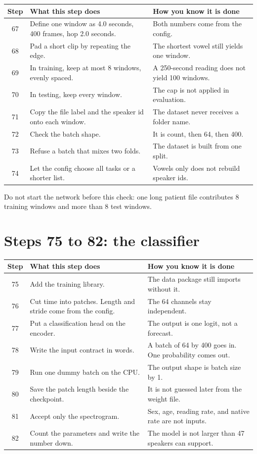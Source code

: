 \documentclass[11pt]{article}
\begin{document}
\begin{longtable}{cp{6.4cm}p{6.4cm}}
\toprule
Step & What this step does & How you know it is done \\
\midrule
\endhead
67 & Define one window as 4.0 seconds, 400 frames, hop 2.0 seconds. & Both numbers come from the config. \\
68 & Pad a short clip by repeating the edge. & The shortest vowel still yields one window. \\
69 & In training, keep at most 8 windows, evenly spaced. & A 250-second reading does not yield 100 windows. \\
70 & In testing, keep every window. & The cap is not applied in evaluation. \\
71 & Copy the file label and the speaker id onto each window. & The dataset never receives a folder name. \\
72 & Check the batch shape. & It is count, then 64, then 400. \\
73 & Refuse a batch that mixes two folds. & The dataset is built from one split. \\
74 & Let the config choose all tasks or a shorter list. & Vowels only does not rebuild speaker ids. \\
\bottomrule
\end{longtable}

Do not start the network before this check: one long patient file contributes 8 training windows and more than 8 test windows.

\section{Steps 75 to 82: the classifier}

\begin{longtable}{cp{6.4cm}p{6.4cm}}
\toprule
Step & What this step does & How you know it is done \\
\midrule
\endhead
75 & Add the training library. & The data package still imports without it. \\
76 & Cut time into patches. Length and stride come from the config. & The 64 channels stay independent. \\
77 & Put a classification head on the encoder. & The output is one logit, not a forecast. \\
78 & Write the input contract in words. & A batch of 64 by 400 goes in. One probability comes out. \\
79 & Run one dummy batch on the CPU. & The output shape is batch size by 1. \\
80 & Save the patch length beside the checkpoint. & It is not guessed later from the weight file. \\
81 & Accept only the spectrogram. & Sex, age, reading rate, and native rate are not inputs. \\
82 & Count the parameters and write the number down. & The model is not larger than 47 speakers can support. \\
\bottomrule
\end{longtable}
\end{document}
